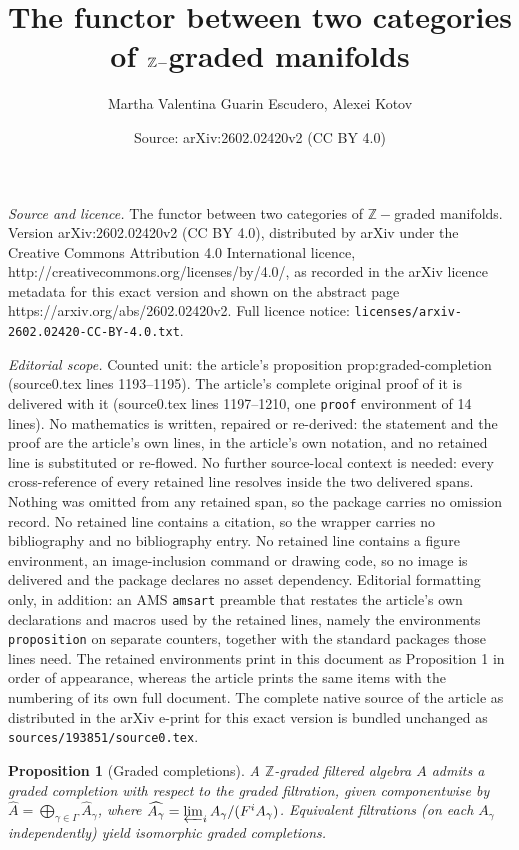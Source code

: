 \documentclass[10pt,a4paper]{amsart}
\title{The functor between two categories of $\Z-$graded manifolds}
\author{Martha Valentina Guarin Escudero, Alexei Kotov}
\date{Source: arXiv:2602.02420v2 (CC BY 4.0)}
\newcommand{\Z}{{\mathbb Z}}
\newtheorem{proposition}{Proposition}
\begin{document}
\maketitle

\noindent\emph{Source and licence.} The functor between two categories of $\Z-$graded manifolds. Version arXiv:2602.02420v2 (CC BY 4.0), distributed by arXiv under the Creative Commons Attribution 4.0 International licence, http://creativecommons.org/licenses/by/4.0/, as recorded in the arXiv licence metadata for this exact version and shown on the abstract page https://arxiv.org/abs/2602.02420v2. Full licence notice: \texttt{licenses/arxiv-2602.02420-CC-BY-4.0.txt}.\par\smallskip

\noindent\textit{Editorial scope.} Counted unit: the article's proposition prop:graded-completion (source0.tex lines 1193--1195). The article's complete original proof of it is delivered with it (source0.tex lines 1197--1210, one \texttt{proof} environment of 14 lines). No mathematics is written, repaired or re-derived: the statement and the proof are the article's own lines, in the article's own notation, and no retained line is substituted or re-flowed.  No further source-local context is needed: every cross-reference of every retained line resolves inside the two delivered spans.  Nothing was omitted from any retained span, so the package carries no omission record.  No retained line contains a citation, so the wrapper carries no bibliography and no bibliography entry.  No retained line contains a figure environment, an image-inclusion command or drawing code, so no image is delivered and the package declares no asset dependency.  Editorial formatting only, in addition: an AMS \texttt{amsart} preamble that restates the article's own declarations and macros used by the retained lines, namely the environments \texttt{proposition} on separate counters, together with the standard packages those lines need.  The retained environments print in this document as Proposition 1 in order of appearance, whereas the article prints the same items with the numbering of its own full document.  The complete native source of the article as distributed in the arXiv e-print for this exact version is bundled unchanged as \texttt{sources/193851/source0.tex}.
\begin{proposition}[Graded completions]\label{prop:graded-completion}\normalfont
A $\mathbb{Z}$-graded filtered algebra $A$ admits a \emph{graded completion} with respect to the graded filtration, given componentwise by $\widehat{A} = \bigoplus_{\gamma\in\Gamma} \widehat{A}_\gamma$, where $\widehat{A_\gamma}=\varprojlim_i A_\gamma/(F^i A_\gamma)$. Equivalent filtrations (on each $A_\gamma$ independently) yield isomorphic graded completions.
\end{proposition}
\end{document}
